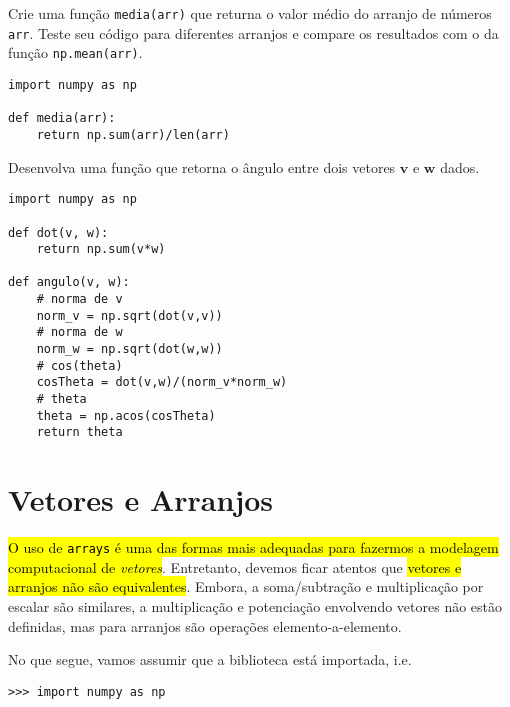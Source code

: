 \begin{exer}
  Crie uma função \lstinline+media(arr)+ que returna o valor médio do arranjo de números \lstinline+arr+. Teste seu código para diferentes arranjos e compare os resultados com o da função \lstinline+np.mean(arr)+.
\end{exer}
\begin{resp}
\begin{lstlisting}
import numpy as np

def media(arr):
    return np.sum(arr)/len(arr)
\end{lstlisting}
\end{resp}

\begin{exer}
  Desenvolva uma função que retorna o ângulo entre dois vetores $\pmb{v}$ e $\pmb{w}$ dados.
\end{exer}
\begin{resp}
\begin{lstlisting}
import numpy as np

def dot(v, w):
    return np.sum(v*w)

def angulo(v, w):
    # norma de v
    norm_v = np.sqrt(dot(v,v))
    # norma de w
    norm_w = np.sqrt(dot(w,w))
    # cos(theta)
    cosTheta = dot(v,w)/(norm_v*norm_w)
    # theta
    theta = np.acos(cosTheta)
    return theta
\end{lstlisting}
\end{resp}


\section{Vetores e Arranjos}\label{cap_arr_sec_vetor}

\hl{O uso de {\lstinline+arrays+} é uma das formas mais adequadas para fazermos a modelagem computacional de \emph{vetores}}. Entretanto, devemos ficar atentos que \hl{vetores e arranjos não são equivalentes}. Embora, a soma/subtração e multiplicação por escalar são similares, a multiplicação e potenciação envolvendo vetores não estão definidas, mas para arranjos são operações elemento-a-elemento.

No que segue, vamos assumir que a biblioteca {\numpy} está importada, i.e.
\begin{lstlisting}
>>> import numpy as np
\end{lstlisting}

